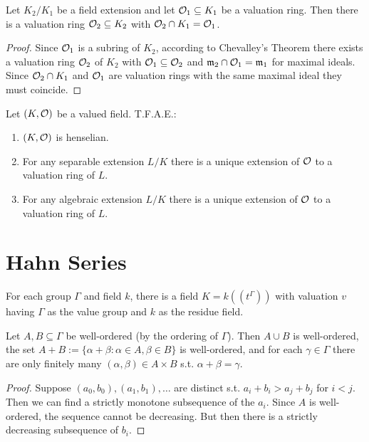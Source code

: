 \documentclass[11pt]{article}
\begin{document}
\begin{lemma}[]
Let \(K_2/K_1\) be a field extension and let \(\mathcal{O}_1\subseteq K_1\) be a valuation ring. Then there is a
valuation ring \(\mathcal{O}_2\subseteq K_2\) with \(\mathcal{O}_2\cap K_1=\mathcal{O}_1\).
\end{lemma}

\begin{proof}
Since \(\mathcal{O}_1\) is a subring of \(K_2\), according to Chevalley's Theorem there exists a valuation
ring \(\mathcal{O}_2\) of \(K_2\) with \(\mathcal{O}_1\subseteq\mathcal{O}_2\) and \(\mathfrak{m}_2\cap\mathcal{O}_1=\mathfrak{m}_1\) for maximal ideals. Since \(\mathcal{O}_2\cap K_1\)
and \(\mathcal{O}_1\) are valuation rings with the same maximal ideal they must coincide.
\end{proof}


\begin{fact}[]
Let \((K,\mathcal{O})\) be a valued field. T.F.A.E.:
\begin{enumerate}
\item \((K,\mathcal{O})\) is henselian.
\item For any separable extension \(L/K\) there is a unique extension of \(\mathcal{O}\) to a
valuation ring of \(L\).
\item For any algebraic extension \(L/K\) there is a unique extension of \(\mathcal{O}\) to a valuation ring
of \(L\).
\end{enumerate}
\end{fact}

\section{Hahn Series}
\label{sec:orge8c8d13}
For each group \(\Gamma\) and field \(k\), there is a field \(K=k((t^\Gamma))\) with valuation \(v\) having
\(\Gamma\) as the value group and \(k\) as the residue field.
\begin{lemma}[]
Let \(A,B\subseteq\Gamma\) be well-ordered (by the ordering of \(\Gamma\)). Then \(A\cup B\) is well-ordered, the
set \(A+B:=\{\alpha+\beta:\alpha\in A,\beta\in B\}\) is well-ordered, and for each \(\gamma\in\Gamma\) there are only finitely
many \((\alpha,\beta)\in A\times B\)  s.t. \(\alpha+\beta=\gamma\).
\end{lemma}

\begin{proof}
Suppose \((a_0,b_0),(a_1,b_1),\dots\) are distinct s.t. \(a_i+b_i>a_j+b_j\) for \(i<j\). Then we can
find a strictly monotone subsequence of the \(a_i\). Since \(A\) is well-ordered, the sequence
cannot be decreasing. But then there is a strictly decreasing subsequence of \(b_i\).
\end{proof}
\end{document}
